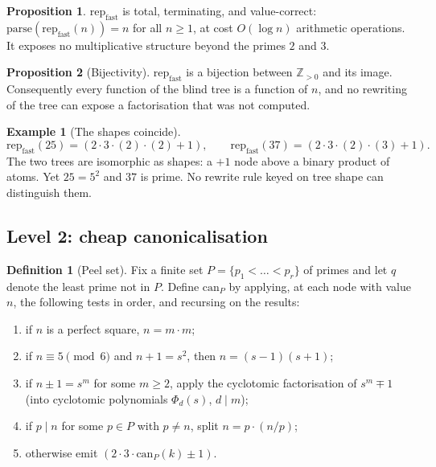 \documentclass[11pt]{article}
\theoremstyle{definition}
\newtheorem{definition}{Definition}
\newtheorem{proposition}{Proposition}
\newtheorem{example}{Example}
\begin{document}
\begin{proposition}
$\mathrm{rep}_{\mathrm{fast}}$ is total, terminating, and value-correct:
$\mathrm{parse}(\mathrm{rep}_{\mathrm{fast}}(n)) = n$ for all $n \ge 1$, at
cost $O(\log n)$ arithmetic operations. It exposes no multiplicative
structure beyond the primes $2$ and $3$.
\end{proposition}

\begin{proposition}[Bijectivity]\label{prop:bijective}
$\mathrm{rep}_{\mathrm{fast}}$ is a bijection between $\mathbb{Z}_{>0}$ and
its image. Consequently every function of the blind tree is a function of $n$,
and no rewriting of the tree can expose a factorisation that was not computed.
\end{proposition}

\begin{example}[The shapes coincide]\label{ex:coincide}
\[
  \mathrm{rep}_{\mathrm{fast}}(25) = (2\cdot3\cdot(2)\cdot(2)+1),
  \qquad
  \mathrm{rep}_{\mathrm{fast}}(37) = (2\cdot3\cdot(2)\cdot(3)+1).
\]
The two trees are isomorphic as shapes: a $+1$ node above a binary product of
atoms. Yet $25 = 5^2$ and $37$ is prime. No rewrite rule keyed on tree shape
can distinguish them.
\end{example}

\subsection{Level 2: cheap canonicalisation}

\begin{definition}[Peel set]
Fix a finite set $P = \{p_1 < \dots < p_r\}$ of primes and let $q$ denote the
least prime not in $P$. Define $\mathrm{can}_P$ by applying, at each node with
value $n$, the following tests in order, and recursing on the results:
\begin{enumerate}
  \item if $n$ is a perfect square, $n = m \cdot m$;
  \item if $n \equiv 5 \pmod 6$ and $n+1 = s^2$, then $n = (s-1)(s+1)$;
  \item if $n \pm 1 = s^m$ for some $m \ge 2$, apply the cyclotomic
        factorisation of $s^m \mp 1$ (into cyclotomic polynomials
        $\Phi_d(s)$, $d\mid m$);
  \item if $p \mid n$ for some $p \in P$ with $p \ne n$, split $n = p \cdot (n/p)$;
  \item otherwise emit $(2\cdot3\cdot \mathrm{can}_P(k) \pm 1)$.
\end{enumerate}
\end{definition}
\end{document}
